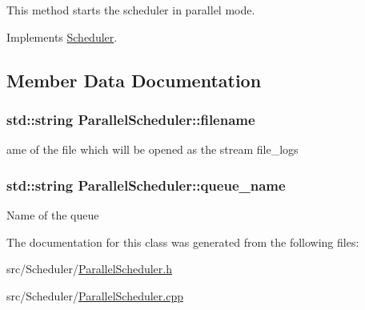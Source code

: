This method starts the scheduler in parallel mode. 



Implements \hyperlink{classScheduler_aaa8fed2f8fab3a5c0e5d1d462915e415}{Scheduler}.



\subsection{Member Data Documentation}
\hypertarget{classParallelScheduler_a5cd72cd536a5183e04b922fa2eb7235e}{
\subsubsection[{filename}]{\setlength{\rightskip}{0pt plus 5cm}std\-::string Parallel\-Scheduler\-::filename\hspace{0.3cm}{\ttfamily [private]}}}\label{classParallelScheduler_a5cd72cd536a5183e04b922fa2eb7235e}
ame of the file which will be opened as the stream file\-\_\-logs \hypertarget{classParallelScheduler_a76e34b4f290c1c4ad68ea3b5429c0ba4}{
\subsubsection[{queue\-\_\-name}]{\setlength{\rightskip}{0pt plus 5cm}std\-::string Parallel\-Scheduler\-::queue\-\_\-name\hspace{0.3cm}{\ttfamily [private]}}}\label{classParallelScheduler_a76e34b4f290c1c4ad68ea3b5429c0ba4}
Name of the queue 

The documentation for this class was generated from the following files\-:\begin{DoxyCompactItemize}
\item 
src/\-Scheduler/\hyperlink{ParallelScheduler_8h}{Parallel\-Scheduler.\-h}\item 
src/\-Scheduler/\hyperlink{ParallelScheduler_8cpp}{Parallel\-Scheduler.\-cpp}\end{DoxyCompactItemize}
